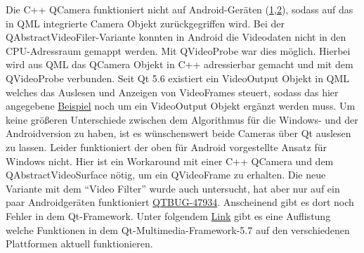 Die C++ QCamera funktioniert nicht auf Android-Geräten (\href{https://bugreports.qt.io/browse/QTBUG-41194}{1},\href{http://stackoverflow.com/questions/28041741/qt-qml-camera-to-c-qimage-on-android}{2}), sodass auf das in QML integrierte Camera Objekt zurückgegriffen wird. Bei der QAbstractVideoFiler-Variante konnten in Android die Videodaten  nicht in den CPU-Adressraum gemappt werden. Mit QVideoProbe war dies möglich. Hierbei wird aus QML das QCamera Objekt in C++ adressierbar gemacht und mit dem QVideoProbe verbunden. Seit Qt 5.6 existiert ein VideoOutput Objekt in QML welches das Auslesen und Anzeigen von VideoFrames steuert, sodass das hier angegebene \href{http://stackoverflow.com/questions/28041741/qt-qml-camera-to-c-qimage-on-android/33238150\#33238150}{Beispiel} noch um ein VideoOutput Objekt ergänzt werden muss. Um keine größeren Unterschiede zwischen dem Algorithmus für die Windows- und der Androidversion zu haben, ist es wünschenswert beide Cameras über Qt auslesen zu lassen. Leider funktioniert der oben für Android vorgestellte Ansatz für Windows nicht. Hier ist ein Workaround mit einer C++ QCamera und dem QAbstractVideoSurface nötig, um ein QVideoFrame zu erhalten. Die neue Variante mit dem "`Video Filter"' wurde auch untersucht, hat aber nur auf ein paar Androidgeräten funktioniert \href{https://bugreports.qt.io/browse/QTBUG-47934/}{QTBUG-47934}. Anscheinend gibt es dort noch Fehler in dem Qt-Framework. Unter folgendem \href{https://wiki.qt.io/Qt_5.7_Multimedia_Backends}{Link} gibt es eine Auflistung welche Funktionen in dem Qt-Multimedia-Framework-5.7 auf den verschiedenen Plattformen aktuell funktionieren.

